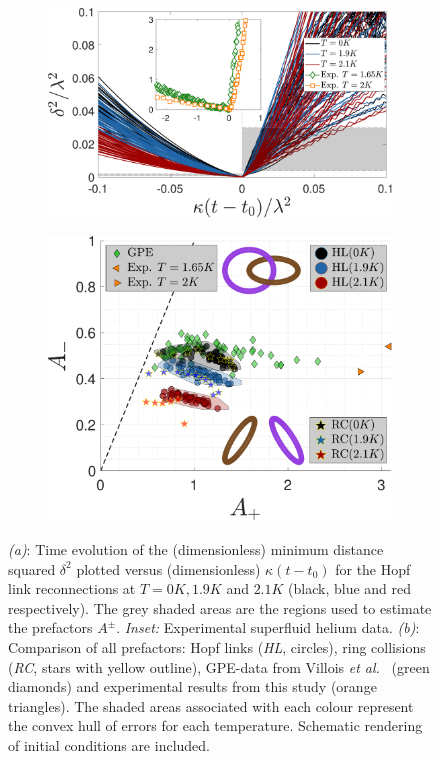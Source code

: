 \documentclass[%
 reprint,
 amsmath,amssymb,
 aps,
 prl,
]{revtex4-2}
\newcommand{\etal}{{\it et al.}~}
\begin{document}
\begin{figure}[t]
	\centering
	\begin{subfigure}[b]{0.45\textwidth}
		\centering
		\includegraphics*[width=\textwidth]{min-delta-with-exp.pdf}
		\caption{}
		\label{fig:minimum-distance}
	\end{subfigure}
	\begin{subfigure}[b]{0.45\textwidth}
		\centering
		\includegraphics*[width=\textwidth]{prefactors-with-exp.pdf}
		\caption{}
		\label{fig:prefactors}
	\end{subfigure}
\caption{\emph{(a)}: Time evolution of the (dimensionless)
minimum distance squared $\delta^2$ plotted versus (dimensionless) $\kappa (t-t_0)$ for
the Hopf link reconnections at $T=0K,1.9K$ and $2.1K$ (black, blue and red
respectively). The grey shaded areas
are the regions used to estimate the prefactors $A^{\pm}$. 
\emph{Inset:} Experimental superfluid helium data.
\emph{(b)}: Comparison of all prefactors: Hopf links (\emph{HL}, circles), 
ring collisions (\emph{RC}, stars with yellow outline), GPE-data 
from Villois \etal \cite{villoisIrreversibleDynamicsVortex2020} (green diamonds) and experimental results from this study (orange triangles). 
The shaded areas associated with each colour represent the convex hull of errors 
for each temperature. Schematic rendering of initial conditions are included.}
\end{figure}
\end{document}
